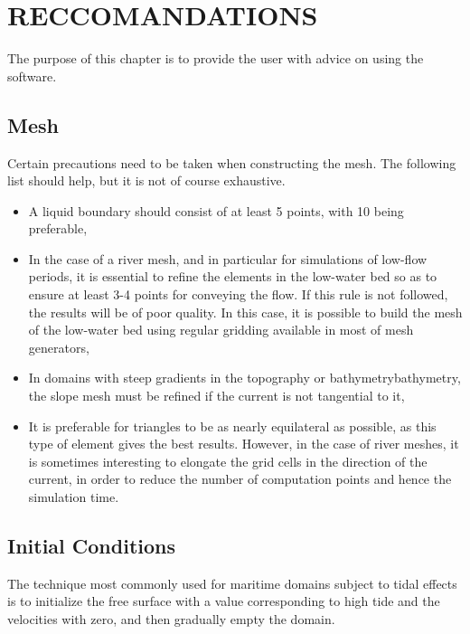 \chapter{  RECCOMANDATIONS}
\label{ch:reccom}
 The purpose of this chapter is to provide the user with advice on using the software.
\section{ Mesh}

 Certain precautions need to be taken when constructing the mesh. The following list should help, but it is not of course exhaustive.

\begin{itemize}
\item  A liquid boundary should consist of at least 5 points, with 10 being preferable,

\item  In the case of a river mesh, and in particular for simulations of low-flow periods, it is essential to refine the elements in the low-water bed so as to ensure at least 3-4 points for conveying the flow. If this rule is not followed, the results will be of poor quality. In this case, it is possible to build the mesh of the low-water bed using regular gridding available in most of mesh generators,

\item  In domains with steep gradients in the topography or bathymetrybathymetry, the slope mesh must be refined if the current is not tangential to it,

\item  It is preferable for triangles to be as nearly equilateral as possible, as this type of element gives the best results. However, in the case of river meshes, it is sometimes interesting to elongate the grid cells in the direction of the current, in order to reduce the number of computation points and hence the simulation time.
\end{itemize}


\section{ Initial Conditions}

 The technique most commonly used for maritime domains subject to tidal effects is to initialize the free surface with a value corresponding to high tide and the velocities with zero, and then gradually empty the domain.

